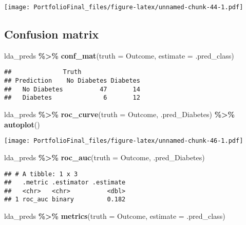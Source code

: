 \documentclass[
]{article}
\newenvironment{Shaded}{\begin{snugshade}}{\end{snugshade}}
\newcommand{\AttributeTok}[1]{\textcolor[rgb]{0.13,0.29,0.53}{#1}}
\newcommand{\FunctionTok}[1]{\textcolor[rgb]{0.13,0.29,0.53}{\textbf{#1}}}
\newcommand{\NormalTok}[1]{#1}
\newcommand{\SpecialCharTok}[1]{\textcolor[rgb]{0.81,0.36,0.00}{\textbf{#1}}}
\begin{document}
\texttt{[image: PortfolioFinal\_files/figure-latex/unnamed-chunk-44-1.pdf]}

\subsection{Confusion matrix}\label{confusion-matrix-2}

\begin{Shaded}
\begin{Highlighting}[]
\NormalTok{lda\_preds }\SpecialCharTok{\%\textgreater{}\%}
  \FunctionTok{conf\_mat}\NormalTok{(}\AttributeTok{truth =}\NormalTok{ Outcome, }\AttributeTok{estimate =}\NormalTok{ .pred\_class)}
\end{Highlighting}
\end{Shaded}

\begin{verbatim}
##              Truth
## Prediction    No Diabetes Diabetes
##   No Diabetes          47       14
##   Diabetes              6       12
\end{verbatim}

\begin{Shaded}
\begin{Highlighting}[]
\NormalTok{lda\_preds }\SpecialCharTok{\%\textgreater{}\%}
  \FunctionTok{roc\_curve}\NormalTok{(}\AttributeTok{truth =}\NormalTok{ Outcome, .pred\_Diabetes) }\SpecialCharTok{\%\textgreater{}\%}
  \FunctionTok{autoplot}\NormalTok{()}
\end{Highlighting}
\end{Shaded}

\texttt{[image: PortfolioFinal\_files/figure-latex/unnamed-chunk-46-1.pdf]}

\begin{Shaded}
\begin{Highlighting}[]
\NormalTok{lda\_preds }\SpecialCharTok{\%\textgreater{}\%}
  \FunctionTok{roc\_auc}\NormalTok{(}\AttributeTok{truth =}\NormalTok{ Outcome, .pred\_Diabetes)}
\end{Highlighting}
\end{Shaded}

\begin{verbatim}
## # A tibble: 1 x 3
##   .metric .estimator .estimate
##   <chr>   <chr>          <dbl>
## 1 roc_auc binary         0.182
\end{verbatim}

\begin{Shaded}
\begin{Highlighting}[]
\NormalTok{lda\_preds }\SpecialCharTok{\%\textgreater{}\%}
  \FunctionTok{metrics}\NormalTok{(}\AttributeTok{truth =}\NormalTok{ Outcome, }\AttributeTok{estimate =}\NormalTok{ .pred\_class)}
\end{Highlighting}
\end{Shaded}
\end{document}

